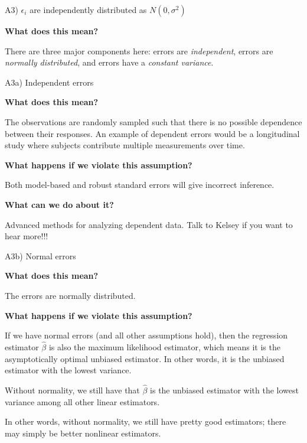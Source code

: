 \documentclass[12pt,ignorenonframetext,]{beamer}
\begin{document}
\begin{frame}{A3) \(\epsilon_i\) are independently distributed as
\(N(0, \sigma^2)\)}

\textbf{What does this mean?}

There are three major components here: errors are \textit{independent},
errors are \textit{normally distributed}, and errors have a
\textit{constant variance}.

\end{frame}

\begin{frame}{A3a) Independent errors}

\textbf{What does this mean?}

The observations are randomly sampled such that there is no possible
dependence between their responses. An example of dependent errors would
be a longitudinal study where subjects contribute multiple measurements
over time.

\pause

\textbf{What happens if we violate this assumption?}

Both model-based and robust standard errors will give incorrect
inference.

\textbf{What can we do about it?}

Advanced methods for analyzing dependent data. Talk to Kelsey if you
want to hear more!!!

\end{frame}

\begin{frame}{A3b) Normal errors}

\textbf{What does this mean?}

The errors are normally distributed.

\pause

\textbf{What happens if we violate this assumption?}

If we have normal errors (and all other assumptions hold), then the
regression estimator \(\hat{\beta}\) is also the maximum likelihood
estimator, which means it is the asymptotically \alert{optimal unbiased}
estimator. In other words, it is the unbiased estimator with the
\alert{lowest variance}.

Without normality, we still have that \(\hat{\beta}\) is the unbiased
estimator with the lowest variance among all other \alert{linear}
estimators.

In other words, without normality, we still have pretty good estimators;
there may simply be better nonlinear estimators.

\end{frame}
\end{document}
